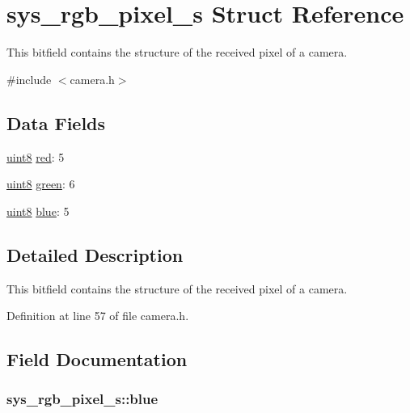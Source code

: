 \hypertarget{structsys__rgb__pixel__s}{}\section{sys\+\_\+rgb\+\_\+pixel\+\_\+s Struct Reference}
\label{structsys__rgb__pixel__s}


This bitfield contains the structure of the received pixel of a camera.  




{\ttfamily \#include $<$camera.\+h$>$}

\subsection*{Data Fields}
\begin{DoxyCompactItemize}
\item 
\hyperlink{definitions_8h_adde6aaee8457bee49c2a92621fe22b79}{uint8} \hyperlink{structsys__rgb__pixel__s_a8f0985f9f96d4c7a6723aa10dcacc93b}{red}\+: 5
\item 
\hyperlink{definitions_8h_adde6aaee8457bee49c2a92621fe22b79}{uint8} \hyperlink{structsys__rgb__pixel__s_aad4178b262be3365f99a3cadece2f528}{green}\+: 6
\item 
\hyperlink{definitions_8h_adde6aaee8457bee49c2a92621fe22b79}{uint8} \hyperlink{structsys__rgb__pixel__s_a92b6e3779404cee9fde835ba597f22c7}{blue}\+: 5
\end{DoxyCompactItemize}


\subsection{Detailed Description}
This bitfield contains the structure of the received pixel of a camera. 

Definition at line 57 of file camera.\+h.



\subsection{Field Documentation}
\hypertarget{structsys__rgb__pixel__s_a92b6e3779404cee9fde835ba597f22c7}{}
\subsubsection[{blue}]{ sys\+\_\+rgb\+\_\+pixel\+\_\+s\+::blue}\label{structsys__rgb__pixel__s_a92b6e3779404cee9fde835ba597f22c7}


